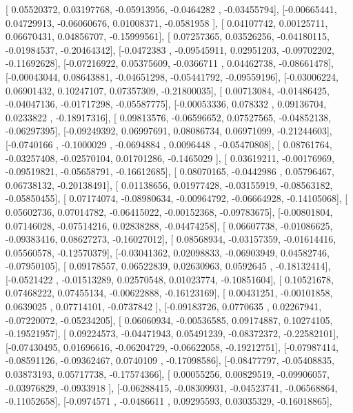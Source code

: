 \documentclass{article}
\begin{document}
       [ 0.05520372,  0.03197768, -0.05913956, -0.0464282 , -0.03455794],
       [-0.00665441,  0.04729913, -0.06060676,  0.01008371, -0.0581958 ],
       [ 0.04107742,  0.00125711,  0.06670431,  0.04856707, -0.15999561],
       [ 0.07257365,  0.03526256, -0.04180115, -0.01984537, -0.20464342],
       [-0.0472383 , -0.09545911,  0.02951203, -0.09702202, -0.11692628],
       [-0.07216922,  0.05375609, -0.0366711 ,  0.04462738, -0.08661478],
       [-0.00043044,  0.08643881, -0.04651298, -0.05441792, -0.09559196],
       [-0.03006224,  0.06901432,  0.10247107,  0.07357309, -0.21800035],
       [ 0.00713084, -0.01486425, -0.04047136, -0.01717298, -0.05587775],
       [-0.00053336,  0.078332  ,  0.09136704,  0.0233822 , -0.18917316],
       [ 0.09813576, -0.06596652,  0.07527565, -0.04852138, -0.06297395],
       [-0.09249392,  0.06997691,  0.08086734,  0.06971099, -0.21244603],
       [-0.0740166 , -0.1000029 , -0.0694884 ,  0.0096448 , -0.05470808],
       [ 0.08761764, -0.03257408, -0.02570104,  0.01701286, -0.1465029 ],
       [ 0.03619211, -0.00176969, -0.09519821, -0.05658791, -0.16612685],
       [ 0.08070165, -0.0442986 ,  0.05796467,  0.06738132, -0.20138491],
       [ 0.01138656,  0.01977428, -0.03155919, -0.08563182, -0.05850455],
       [ 0.07174074, -0.08980634, -0.00964792, -0.06664928, -0.14105068],
       [ 0.05602736,  0.07014782, -0.06415022, -0.00152368, -0.09783675],
       [-0.00801804,  0.07146028, -0.07514216,  0.02838288, -0.04474258],
       [ 0.06607738, -0.01086625, -0.09383416,  0.08627273, -0.16027012],
       [ 0.08568934, -0.03157359, -0.01614416,  0.05560578, -0.12570379],
       [-0.03041362,  0.02098833, -0.06903949,  0.04582746, -0.07950105],
       [ 0.09178557,  0.06522839,  0.02630963,  0.0592645 , -0.18132414],
       [-0.0521422 , -0.01513289,  0.02570548,  0.01023774, -0.10851604],
       [ 0.10521678,  0.07468222,  0.07455134, -0.00622888, -0.16123169],
       [ 0.00431251, -0.00101858,  0.0639025 ,  0.07714101, -0.0737842 ],
       [-0.09183726,  0.0770635 ,  0.02267941, -0.07220072, -0.05234205],
       [ 0.06060934, -0.00536585,  0.09174887,  0.10274105, -0.19521957],
       [ 0.09224573, -0.04471943,  0.05491239, -0.08372372, -0.22582101],
       [-0.07430495,  0.01696616, -0.06204729, -0.06622058, -0.19212751],
       [-0.07987414, -0.08591126, -0.09362467,  0.0740109 , -0.17098586],
       [-0.08477797, -0.05408835,  0.03873193,  0.05717738, -0.17574366],
       [ 0.00055256,  0.00829519, -0.09906057, -0.03976829, -0.0933918 ],
       [-0.06288415, -0.08309931, -0.04523741, -0.06568864, -0.11052658],
       [-0.0974571 , -0.0486611 ,  0.09295593,  0.03035329, -0.16018865],
\end{document}
